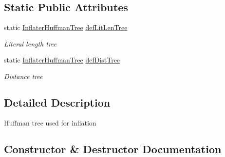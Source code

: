 \subsection*{Static Public Attributes}
\begin{DoxyCompactItemize}
\item 
static \hyperlink{class_i_c_sharp_code_1_1_sharp_zip_lib_1_1_zip_1_1_compression_1_1_inflater_huffman_tree}{Inflater\+Huffman\+Tree} \hyperlink{class_i_c_sharp_code_1_1_sharp_zip_lib_1_1_zip_1_1_compression_1_1_inflater_huffman_tree_a24f966058f7ef645e491ecad7d1b03f4}{def\+Lit\+Len\+Tree}
\begin{DoxyCompactList}\small\item\em Literal length tree \end{DoxyCompactList}\item 
static \hyperlink{class_i_c_sharp_code_1_1_sharp_zip_lib_1_1_zip_1_1_compression_1_1_inflater_huffman_tree}{Inflater\+Huffman\+Tree} \hyperlink{class_i_c_sharp_code_1_1_sharp_zip_lib_1_1_zip_1_1_compression_1_1_inflater_huffman_tree_a97745fb6c041faa130145ec082fa5f1d}{def\+Dist\+Tree}
\begin{DoxyCompactList}\small\item\em Distance tree \end{DoxyCompactList}\end{DoxyCompactItemize}


\subsection{Detailed Description}
Huffman tree used for inflation 



\subsection{Constructor \& Destructor Documentation}
\mbox{\label{class_i_c_sharp_code_1_1_sharp_zip_lib_1_1_zip_1_1_compression_1_1_inflater_huffman_tree_a75f3f45273de2a95bb3f3ea01447c382}} 
